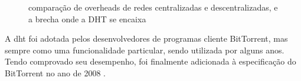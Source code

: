 \begin{figure}[H]
    \centering
    \caption{comparação de overheads de redes centralizadas e descentralizadas, e a
    brecha onde a DHT se encaixa}
\end{figure}

A \gls*{dht} foi adotada pelos desenvolvedores de programas cliente BitTorrent, mas
sempre como uma funcionalidade particular, sendo utilizada por alguns anos. Tendo
comprovado seu desempenho, foi finalmente adicionada à especificação do BitTorrent no
ano de 2008 \cite{site:bittorrent-dht}.


